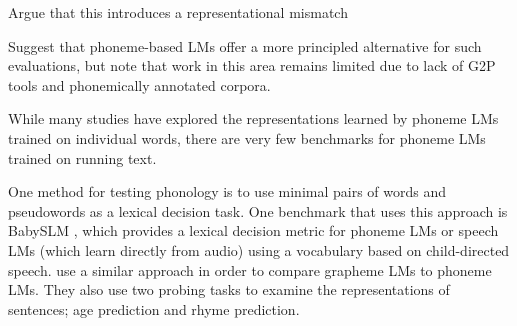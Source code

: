 Argue that this introduces a representational mismatch

Suggest that phoneme-based LMs offer a more principled alternative for such evaluations, but note that work in this area remains limited due to lack of G2P tools and phonemically annotated corpora.



While many studies have explored the representations learned by phoneme LMs trained on individual words, there are very few benchmarks for phoneme LMs trained on running text.

One method for testing phonology is to use minimal pairs of words and pseudowords as a lexical decision task. One benchmark that uses this approach is BabySLM \citep{lavechin}, which provides a lexical decision metric for phoneme LMs or speech LMs (which learn directly from audio) using a vocabulary based on child-directed speech. \citet{bunzeck-etal-2025-small} use a similar approach in order to compare grapheme LMs to phoneme LMs. They also use two probing tasks to examine the representations of sentences; age prediction and rhyme prediction. %



